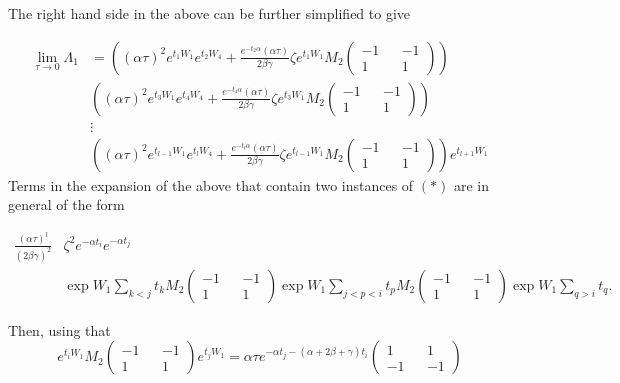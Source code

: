 \documentclass{article}
\begin{document}
The right hand side in the above can be further simplified to give

\begin{align}\label{lambda_1_factor}
  \lim_{\tau \rightarrow 0} \Lambda_1 &= \left((\alpha\tau)^2e^{t_1W_1}e^{t_2W_4}+\frac{e^{-t_2\alpha}(\alpha\tau)}{2\beta\gamma}\zeta e^{t_1W_1}M_2\begin{pmatrix} -1 && -1 \\ 1 && 1 \end{pmatrix}\right) \nonumber \\
  &\left((\alpha\tau)^2e^{t_3W_1}e^{t_4W_4}+\frac{e^{-t_4\alpha}(\alpha\tau)}{2\beta\gamma}\zeta e^{t_3W_1}M_2\begin{pmatrix} -1 && -1 \\ 1 && 1 \end{pmatrix}\right) \nonumber \\
  &\vdots \nonumber \\
  &\left((\alpha\tau)^2e^{t_{l-1}W_1}e^{t_lW_4}+\frac{e^{-t_{l}\alpha}(\alpha\tau)}{2\beta\gamma}\zeta e^{t_{l-1}W_1}M_2\begin{pmatrix} -1 && -1 \\ 1 && 1 \end{pmatrix}\right)e^{t_{l+1}W_1}
\end{align}
Terms in the expansion of the above that contain two instances of $(\ast)$ are in general of the form

\begin{align}\label{two_instances}
  \frac{(\alpha \tau)^l}{(2\beta\gamma)^2}&\zeta^2e^{-\alpha t_i}e^{-\alpha t_j}\nonumber \\ &\exp{W_1\sum_{k < j}t_k}M_2\begin{pmatrix} -1 && -1 \\ 1 && 1 \end{pmatrix}\exp{W_1\sum_{j < p < i}t_p}M_2\begin{pmatrix} -1 && -1 \\ 1 && 1 \end{pmatrix}\exp{W_1\sum_{q>i}t_q}.
\end{align}

Then, using that
\begin{equation}
  e^ {t_i W_1}M_2\begin{pmatrix} -1 && -1 \\ 1 && 1 \end{pmatrix}e^{t_jW_1} = \alpha\tau e^{-\alpha t_j - (\alpha +2\beta+\gamma )t_i}\begin{pmatrix} 1 && 1 \\ -1 && -1 \end{pmatrix}
\end{equation}
\end{document}
